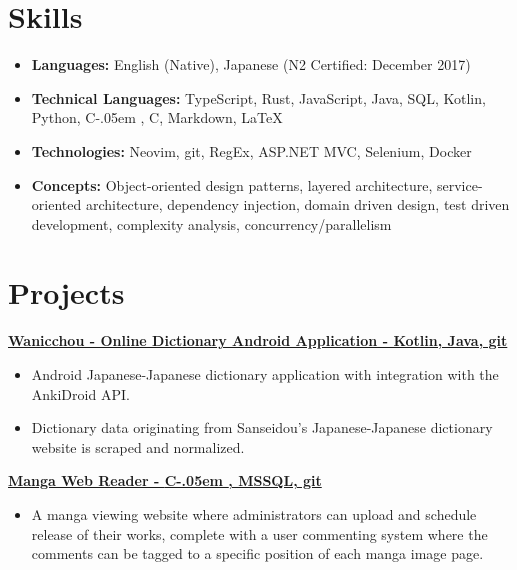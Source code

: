 \documentclass[letterpaper,11pt]{article}
\newcommand{\resumeItem}[2]{
    \vspace{-2pt}
    \item\small{
        \textbf{#1}{ #2 \vspace{-2pt}}
    }
}
\newcommand{\resumeSubItem}[2]{\resumeItem{#1}{#2}}
\newcommand{\resumeItemListStart}{\begin{itemize}}
\newcommand{\resumeItemListEnd}{\end{itemize}}
\def\Cplusplus{C\raisebox{0.5ex}{\tiny\textbf{++}}}
\newcommand{\Csharp}{%
  {\settoheight{\dimen0}{C}C\kern-.05em \resizebox{!}{\dimen0}{\raisebox{\depth}{\#}}}}
\begin{document}
\section{\textbf{Skills}}
\begin{itemize}
    \resumeSubItem{\textbf{Languages:}}
        {
            English (Native),
            Japanese (N2 Certified: December 2017)
        }
    \resumeSubItem{\textbf{Technical Languages:}}
        {
            TypeScript,
            Rust,
            JavaScript,
            Java,
            SQL,
            Kotlin,
            Python,
            \Csharp,
            \Cplusplus,
            Markdown,
            \LaTeX
        }
    \resumeSubItem{\textbf{Technologies:}}
        {
            Neovim,
            git,
            RegEx,
            ASP.NET MVC,
            Selenium,
            Docker
        }
    \resumeSubItem{\textbf{Concepts:}}
        {
            Object-oriented design patterns,
            layered architecture,
            service-oriented architecture,
            dependency injection,
            domain driven design,
            test driven development,
            complexity analysis,
            concurrency/parallelism
        }
 \end{itemize}

\section{\textbf{Projects}}
    \small{\textbf{
        \href {
            https://github.com/Limegrass/Wanicchou
        } {
            Wanicchou - Online Dictionary Android Application
            - Kotlin, Java, git
        }}}
    \resumeItemListStart
        \resumeItem{}
            {
                Android Japanese-Japanese dictionary application with integration with the AnkiDroid API.
            }
        \resumeItem{}
            {
                Dictionary data originating from Sanseidou's Japanese-Japanese
                dictionary website is scraped and normalized.
            }
    \resumeItemListEnd
    \small{\textbf{
        \href{
            https://waifusims.com/Manga/Hakoiri
        }{
            Manga Web Reader
            - \Csharp, MSSQL, git
        }}}
    \resumeItemListStart
        \resumeItem{}
            {
                A manga viewing website where administrators can upload and schedule
                release of their works, complete with a user commenting system
                where the comments can be tagged to a specific position of each manga
                image page.
            }
    \resumeItemListEnd
\end{document}
